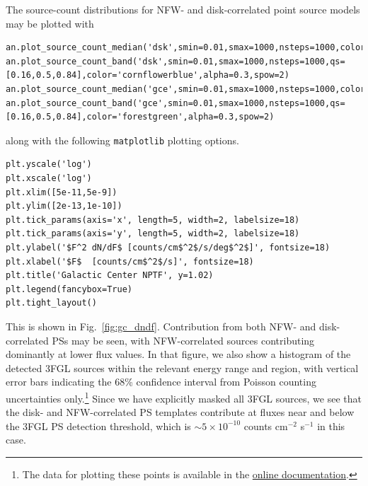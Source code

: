 The source-count distributions for NFW- and disk-correlated point source models may be plotted with
\begin{lstlisting}
an.plot_source_count_median('dsk',smin=0.01,smax=1000,nsteps=1000,color='cornflowerblue',spow=2,label='Disk')
an.plot_source_count_band('dsk',smin=0.01,smax=1000,nsteps=1000,qs=[0.16,0.5,0.84],color='cornflowerblue',alpha=0.3,spow=2)
an.plot_source_count_median('gce',smin=0.01,smax=1000,nsteps=1000,color='forestgreen',spow=2,label='GCE')
an.plot_source_count_band('gce',smin=0.01,smax=1000,nsteps=1000,qs=[0.16,0.5,0.84],color='forestgreen',alpha=0.3,spow=2)
\end{lstlisting}
along with the following \texttt{matplotlib} plotting options. 
\begin{lstlisting}
plt.yscale('log')
plt.xscale('log')
plt.xlim([5e-11,5e-9])
plt.ylim([2e-13,1e-10])
plt.tick_params(axis='x', length=5, width=2, labelsize=18)
plt.tick_params(axis='y', length=5, width=2, labelsize=18)
plt.ylabel('$F^2 dN/dF$ [counts/cm$^2$/s/deg$^2$]', fontsize=18)
plt.xlabel('$F$  [counts/cm$^2$/s]', fontsize=18)
plt.title('Galactic Center NPTF', y=1.02)
plt.legend(fancybox=True)
plt.tight_layout()
\end{lstlisting}
This is shown in Fig.~\ref{fig:gc_dndf}. Contribution from both NFW- and disk-correlated PSs may be seen, with NFW-correlated sources contributing dominantly at lower flux values.  In that figure, we also show a histogram of the detected 3FGL sources within the relevant energy range and region, with vertical error bars indicating the 68\% confidence interval from Poisson counting uncertainties only.\footnote{The data for plotting these points is available in the \href{http://nptfit.readthedocs.io}{online documentation}.}  Since we have explicitly masked all 3FGL sources, we see that the disk- and NFW-correlated PS templates contribute at fluxes near and below the 3FGL PS detection threshold, which is $\sim$$5 \times 10^{-10}$ counts cm$^{-2}$ s$^{-1}$ in this case.

